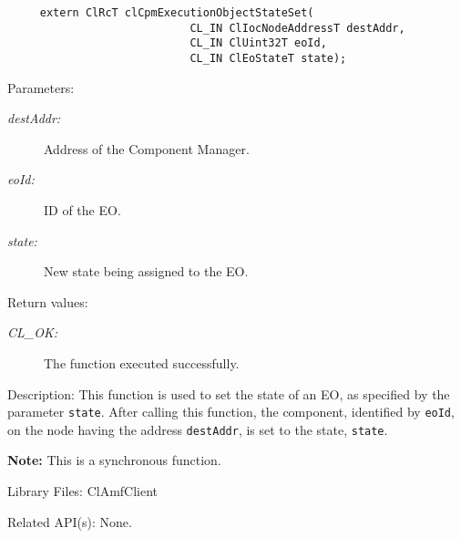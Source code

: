 {\begin{Desc}
\footnotesize\begin{verbatim}     extern ClRcT clCpmExecutionObjectStateSet(
                			CL_IN ClIocNodeAddressT destAddr,
                			CL_IN ClUint32T eoId,
                			CL_IN ClEoStateT state);
\end{verbatim}
\normalsize
\end{Desc}
\begin{Desc}
\item[Parameters:]
\begin{description}
\item[{\em dest\-Addr:}]Address of the Component Manager. \item[{\em eo\-Id:}]ID of the EO. \item[{\em state:}]New state being assigned to the EO.\end{description}
\end{Desc}
\begin{Desc}
\item[Return values:]
\begin{description}
\item[{\em CL\_\-OK:}]The function executed successfully.\end{description}
\end{Desc}
\begin{Desc}
\item[Description:]This function is used to set the state of an EO, as specified by the parameter {\tt {state}}. After calling this function, 
the component, identified by {\tt{eo\-Id}}, on the node having the address {\tt{dest\-Addr}}, is set to the state, {\tt{state}}.\end{Desc}
{\bf Note:} This is a synchronous function.
\begin{Desc}
\item[Library Files:]Cl\-Amf\-Client\end{Desc}

\begin{Desc}
\item[Related API(s):]None. \end{Desc}

\newpage








}
